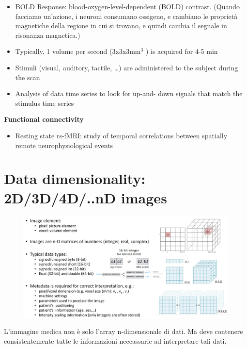 \begin{itemize}
	\item BOLD Response: blood-oxygen-level-dependent (BOLD) contrast. (Quando facciamo un'azione, i neuroni consumano ossigeno, e cambiano le proprietà magnetiche della regione in cui si trovano, e quindi cambia il segnale in risonanza magnetica.)
	\item Typically, 1 volume per second (3x3x3mm$^3$ ) is
	acquired for 4-5 min
	\item Stimuli (visual, auditory, tactile, …) are
	administered to the subject during the scan
	\item Analysis of data time series to look for up-and-
	down signals that match the stimulus time
	series
\end{itemize}

\textbf{Functional connectivity}

\begin{itemize}
	\item Resting state rs-fMRI: study of temporal correlations between spatially remote neurophysiological events
\end{itemize}

\newpage

\section{Data dimensionality: 2D/3D/4D/..nD images}

\begin{figure}[ht]
	\centering
	\includegraphics[width=1\linewidth]{figure_med/datadim}

\end{figure}
\FloatBarrier


L'immagine medica non è solo l'array n-dimensionale di dati. Ma deve contenere consistentemente tutte le informazioni neccassarie ad interpretare tali dati.

